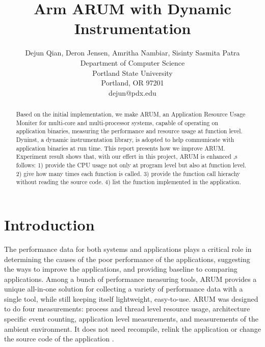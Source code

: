\documentclass[11pt,letterpaper,oneside]{article}
\title{Arm ARUM with Dynamic Instrumentation}
\author{Dejun Qian, Deron Jensen, Amritha Nambiar, Sisinty Sasmita Patra\\Department of Computer Science\\Portland State University\\Portland, OR 97201\\dejun@pdx.edu}
\begin{document}
\maketitle

\begin{abstract}
Based on the initial implementation, we make ARUM, an Application Resource Usage Moniter for multi-core and multi-processor systems, capable of operating on application binaries, measuring the performance and resource usage at function level. Dyninst, a dynamic instrumentation library, is adopted to help communicate with application binaries at run time. This report presents how we improve ARUM. Experiment result shows that, with our effert in this project, ARUM is enhanced ,s follows:  1) provide the CPU usage not only at program level but also at function level. 2) give how many times each function is called. 3) provide the function call hierachy without reading the source code. 4) list the function implemented in the application.
\end{abstract}

\section{Introduction}
\label{sec:introduction}
The performance data for both systems and applications plays a critical role in determining the causes of the poor performance of the applications, suggesting the ways to improve the applications, and providing baseline to comparing applications. Among a bunch of performance measuring tools, ARUM provides a unique all-in-one solution for collecting a variety of performance data with a single tool, while still keeping itself lightweight, easy-to-use. ARUM was designed to do four measurements: process and thread level resource usage, architecture specific event counting, application level measurements, and measurements of the ambient environment. It does not need recompile, relink the application or change the source code of the application \cite{bib:knapp}.
\end{document}
